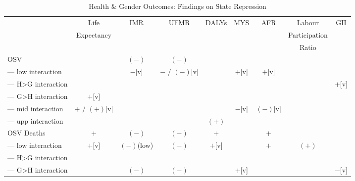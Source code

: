 \begin{landscape}
\begin{table}[!htbp]
\centering
\caption{Health \& Gender Outcomes: Findings on State Repression}
\label{table_hg_repression}
\begin{tabular}{lcccccccc}
\toprule
                    & Life           & IMR                     & UFMR           & DALYs    & MYS    & AFR                     & Labour        & GII \\
                    & Expectancy     &                         &                &          &        &                         & Participation & \\
                    &                &                         &                &          &        &                         & Ratio         & \\
\midrule
OSV                 &                & $(-)$                   & $(-)$          &          &        &                         &               & \\
--- low interaction &                & $-$[v]                  & $-$ / $(-)$[v] &          & $+$[v] & $+$[v]                  &               & \\
--- H>G interaction &                &                         &                &          &        &                         &               & $+$[v] \\
--- G>H interaction & $+$[v]         &                         &                &          &        &                         &               & \\
--- mid interaction & $+$ / $(+)$[v] &                         &                &          & $-$[v] & $(-)$[v]                &               & \\
--- upp interaction &                &                         &                & $(+)$    &        &                         &               & \\
OSV Deaths          & $+$            & $(-)$                   & $(-)$          & $+$      &        & $+$                     &               & \\
--- low interaction & $+$[v]         & $(-)$(low)              & $(-)$          & $+$[v]   &        & $+$                     & $(+)$         & \\
--- H>G interaction &                &                         &                &          &        &                         &               & \\
--- G>H interaction &                & $(-)$                   & $(-)$          &          & $+$[v] &                         &               & $-$[v] \\

\end{tabular}
\end{table}
\end{landscape}
